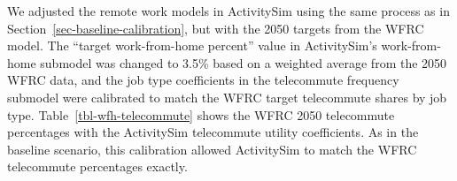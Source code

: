 \documentclass[fancy, twoside, mastersfancy, ms]{byuthesis}
\begin{document}
\begin{table}

\caption{\label{tbl-wfrc-remote-work-years}Comparison of Remote Work
Rates in the WFRC Model by Year}


\end{table}%

We adjusted the remote work models in ActivitySim using the same process
as in Section~\ref{sec-baseline-calibration}, but with the 2050 targets
from the WFRC model. The ``target work-from-home percent'' value in
ActivitySim's work-from-home submodel was changed to 3.5\% based on a
weighted average from the 2050 WFRC data, and the job type coefficients
in the telecommute frequency submodel were calibrated to match the WFRC
target telecommute shares by job type. Table~\ref{tbl-wfh-telecommute}
shows the WFRC 2050 telecommute percentages with the ActivitySim
telecommute utility coefficients. As in the baseline scenario, this
calibration allowed ActivitySim to match the WFRC telecommute
percentages exactly.
\end{document}
